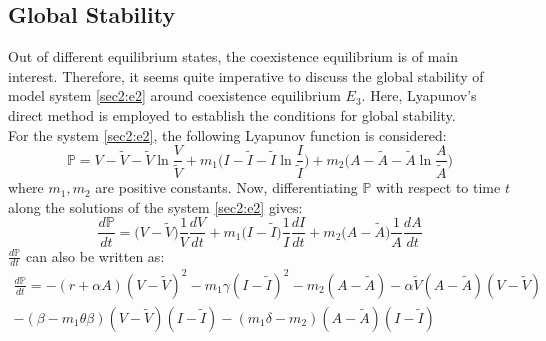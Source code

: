 \documentclass[12pt]{article}
\numberwithin{equation}{section}
\begin{document}
\subsection{Global Stability}
Out of different equilibrium states, the coexistence equilibrium is of main interest. Therefore, it seems quite imperative to discuss the global stability of model system \eqref{sec2:e2} around coexistence equilibrium $E_3$. Here, Lyapunov's direct method is employed to establish the conditions for global stability.\\
For the system \eqref{sec2:e2}, the following Lyapunov function is considered:
\begin{equation}\label{sec3:e36}
\mathbb P = V-\tilde V-\tilde V\ln\frac{V}{\tilde V}+m_1\bigg(I-\tilde I-\tilde I\ln\frac{I}{\tilde I}\bigg)+m_2\bigg(A-\tilde A-\tilde A\ln\frac{A}{\tilde A}\bigg)
\end{equation}
where $m_1,m_2$ are positive constants. Now, differentiating $\mathbb P$ with respect to time $t$ along the solutions of the system \eqref{sec2:e2} gives:
\begin{equation}\label{sec3:e37}
\frac{d\mathbb P}{dt}=\bigg(V-\tilde V\bigg)\frac{1}{V}\frac{dV}{dt} + m_1\bigg(I-\tilde I\bigg)\frac{1}{I}\frac{dI}{dt} + m_2 \bigg(A-\tilde A\bigg)\frac{1}{A}\frac{dA}{dt}
\end{equation}
$\frac{d \mathbb P}{dt}$ can also be written as:
\begin{equation}\label{sec3:e41}
\begin{split}
\frac{d\mathbb P}{dt} = -(r+\alpha A)(V-\tilde V)^2 - m_1\gamma(I-\tilde I)^2-m_2(A-\tilde A)-\alpha \tilde V(A-\tilde A)(V-\tilde V)\\ - (\beta-m_1\theta\beta)(V-\tilde V)(I-\tilde I) - (m_1\delta-m_2)(A-\tilde A)(I-\tilde I)
\end{split}
\end{equation}
\end{document}
